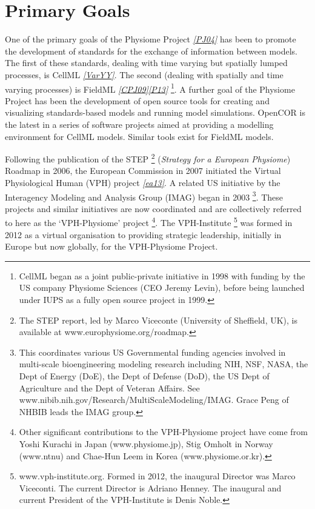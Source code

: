 \documentclass[a4paper,10pt,english]{sphinxmanual}
\begin{document}
\section{Primary Goals}
\label{background:primary-goals}
One of the primary goals of the Physiome Project \label{background:id2}{\hyperref[zreferences:id12]{\emph{{[}PJ04{]}}}} has been to promote
the development of standards for the exchange of information between
models. The first of these standards, dealing with time varying but
spatially lumped processes, is CellML \label{background:id3}{\hyperref[zreferences:id13]{\emph{{[}VarYY{]}}}}. The second (dealing with
spatially and time varying processes) is FieldML \label{background:id4}{\hyperref[zreferences:id3]{\emph{{[}CPJ09{]}}}}\label{background:id5}{\hyperref[zreferences:id11]{\emph{{[}P13{]}}}} \footnote[2]{
CellML began as a joint public-private initiative in 1998 with
funding by the US company Physiome Sciences (CEO Jeremy Levin),
before being launched under IUPS as a fully open source project in
1999.
}. A further
goal of the Physiome Project has been the development of open source
tools for creating and visualizing standards-based models and running
model simulations. OpenCOR is the latest in a series of software
projects aimed at providing a modelling environment for CellML models.
Similar tools exist for FieldML models.

Following the publication of the STEP \footnote[3]{
The STEP report, led by Marco Viceconte (University of Sheffield,
UK), is available at
www.europhysiome.org/roadmap.
} (\emph{Strategy for a European
Physiome}) Roadmap in 2006, the European Commission in 2007 initiated
the Virtual Physiological Human (VPH) project \label{background:id8}{\hyperref[zreferences:id8]{\emph{{[}ea13{]}}}}. A related US
initiative by the Interagency Modeling and Analysis Group (IMAG) began
in 2003 \footnote[4]{
This coordinates various US Governmental funding agencies involved in
multi-scale bioengineering modeling research including NIH, NSF,
NASA, the Dept of Energy (DoE), the Dept of Defense (DoD), the US
Dept of Agriculture and the Dept of Veteran Affairs. See
www.nibib.nih.gov/Research/MultiScaleModeling/IMAG.
Grace Peng of NHBIB leads the IMAG group.
}. These projects and similar initiatives are now coordinated
and are collectively referred to here as the ‘VPH-Physiome’
project \footnote[5]{
Other significant contributions to the VPH-Physiome project have come
from Yoshi Kurachi in Japan
(www.physiome.jp), Stig Omholt in Norway
(www.ntnu) and Chae-Hun Leem in Korea
(www.physiome.or.kr).
}. The VPH-Institute \footnote[6]{
www.vph-institute.org. Formed in 2012, the
inaugural Director was Marco Viceconti. The current Director is
Adriano Henney. The inaugural and current President of the
VPH-Institute is Denis Noble.
} was formed in 2012 as a virtual
organisation to providing strategic leadership, initially in Europe but
now globally, for the VPH-Physiome Project.
\end{document}
